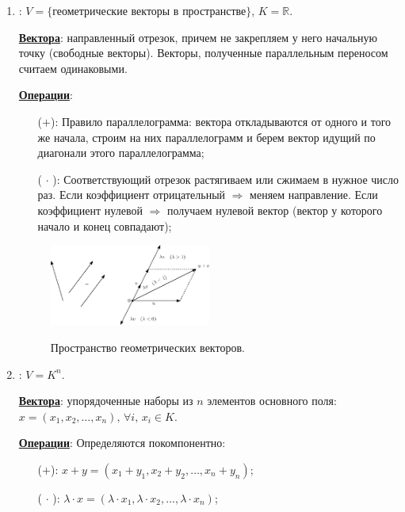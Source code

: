 \documentclass[12pt]{article}
\newcommand{\MR}{\mathbb{R}}
\theoremstyle{definition}
\begin{document}
\begin{enumerate}[label=\arabic*)]
	\item {}: $V = \{\text{геометрические векторы в пространстве}\}$, $K = \MR$.
	
	\textbf{\uline{Вектора}}: направленный отрезок, причем не закрепляем у него начальную точку (свободные векторы). Векторы, полученные параллельным переносом считаем одинаковыми. 
	
	\textbf{\uline{Операции}}:
	\begin{enumerate}
		\item[($+$):] Правило параллелограмма: вектора откладываются от одного и того же начала, строим на них параллелограмм и берем вектор идущий по диагонали этого параллелограмма;
		\item[($\, \cdot\, $):] Соответствующий отрезок растягиваем или сжимаем в нужное число раз. Если коэффициент отрицательный $\Rightarrow$ меняем направление. Если коэффициент нулевой $\Rightarrow$ получаем нулевой вектор (вектор у которого начало и конец совпадают);
	\end{enumerate}
	
	\begin{figure}[H]
		\centering
		\includegraphics[width=0.5\textwidth]{LAL1_1.eps}
		\label{LAL1_1}
		\caption{Пространство геометрических векторов.}
		\label{fig: Проекция на пространство}
	\end{figure}

	\item {}: $V = K^n$.
	
	\textbf{\uline{Вектора}}: упорядоченные наборы из $n$ элементов основного поля: $x = (x_1, x_2, \dotsc, x_n), \, \forall i ,\, x_i \in K$.
	
	\textbf{\uline{Операции}}: Определяются покомпонентно:
	\begin{enumerate}
		\item[($+$):] $x + y = (x_1 + y_1, x_2 + y_2, \dotsc, x_n + y_n)$;
		\item[($\, \cdot\, $):] $\lambda{\cdot}x = (\lambda{\cdot}x_1, \lambda{\cdot}x_2, \dotsc, \lambda{\cdot}x_n)$;
	\end{enumerate}


\end{enumerate}
\end{document}
